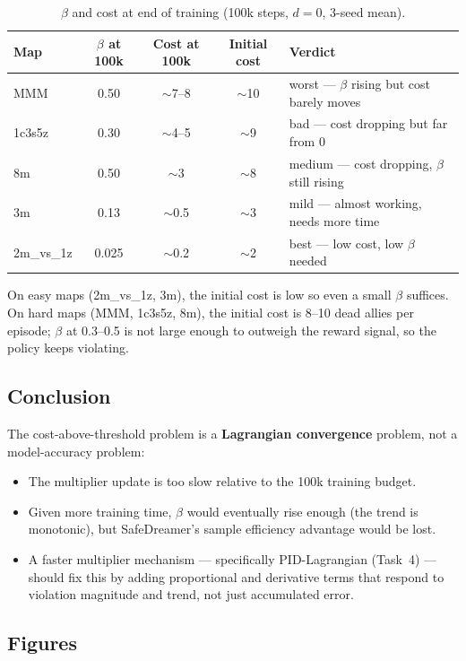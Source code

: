 \documentclass[10pt]{article}
\begin{document}
\begin{table}[h]
\centering
\small
\begin{tabular}{lcccl}
\toprule
Map & $\beta$ at 100k & Cost at 100k & Initial cost & Verdict \\
\midrule
MMM      & 0.50  & $\sim$7--8 & $\sim$10 & worst --- $\beta$ rising but cost barely moves \\
1c3s5z   & 0.30  & $\sim$4--5 & $\sim$9  & bad --- cost dropping but far from 0 \\
8m       & 0.50  & $\sim$3    & $\sim$8  & medium --- cost dropping, $\beta$ still rising \\
3m       & 0.13  & $\sim$0.5  & $\sim$3  & mild --- almost working, needs more time \\
2m\_vs\_1z & 0.025 & $\sim$0.2  & $\sim$2  & best --- low cost, low $\beta$ needed \\
\bottomrule
\end{tabular}
\caption{$\beta$ and cost at end of training (100k steps, $d=0$, 3-seed mean).}
\label{tab:beta_summary}
\end{table}

On easy maps (2m\_vs\_1z, 3m), the initial cost is low so even a small $\beta$
suffices.  On hard maps (MMM, 1c3s5z, 8m), the initial cost is 8--10 dead
allies per episode; $\beta$ at 0.3--0.5 is not large enough to outweigh the
reward signal, so the policy keeps violating.

\subsection*{Conclusion}
The cost-above-threshold problem is a \textbf{Lagrangian convergence} problem,
not a model-accuracy problem:
\begin{itemize}
  \item The multiplier update is too slow relative to the 100k training budget.
  \item Given more training time, $\beta$ would eventually rise enough (the
        trend is monotonic), but SafeDreamer's sample efficiency advantage
        would be lost.
  \item A faster multiplier mechanism --- specifically PID-Lagrangian
        (Task~4) --- should fix this by adding proportional and derivative
        terms that respond to violation magnitude and trend, not just
        accumulated error.
\end{itemize}

\subsection*{Figures}
\end{document}
